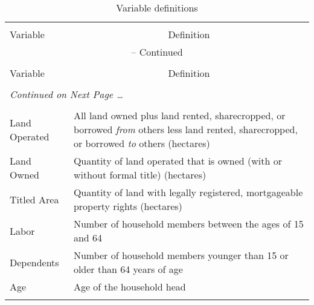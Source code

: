 \documentclass[english]{article}
\begin{document}
\footnotesize
\begin{longtable}{l  p{10.5cm}}
\caption[Variable definitions]{Variable definitions} \\[-2ex] 

\hline \hline \\[-5ex]
\multicolumn{1}{l}{Variable} &
\multicolumn{1}{c}{Definition}\\[0.0ex]   \hline
\endfirsthead

\multicolumn{2}{c}{\normalsize{\tablename} \thetable{} -- Continued} \\
\hline \hline \\[-5ex]
\multicolumn{1}{l}{Variable} &
\multicolumn{1}{c}{Definition}\\[0.0ex]  
  \\[-4.5ex]
\endhead

\multicolumn{2}{l}{{\textit{Continued on Next Page \ldots}}} \\
\endfoot

  \\[-1.8ex]
\endlastfoot

Land Operated & All land owned plus land rented, sharecropped, or borrowed \emph{from} others less land rented, sharecropped, or borrowed \emph{to} others (hectares) \\

Land Owned & Quantity of land operated that is owned (with or without formal title) (hectares)\\

Titled Area & Quantity of land with legally registered, mortgageable property rights (hectares)\\

Labor  & Number of household members between the ages of 15 and 64 \\

Dependents & Number of household members younger than 15 or older than 64 years of age \\ 

Age  & Age of the household head \\ \hline
\label{def}
\end{longtable}
\normalsize
\newpage

\end{document}
